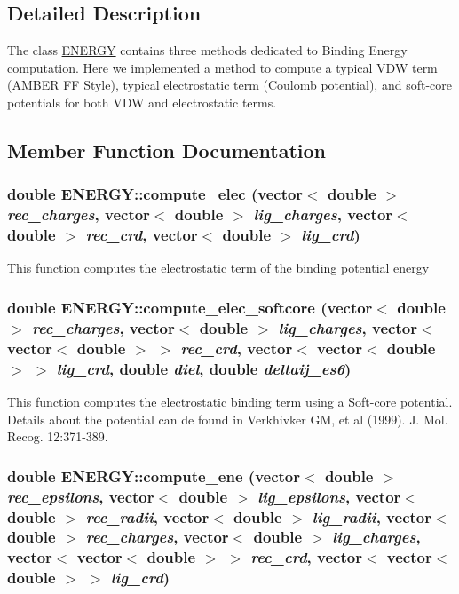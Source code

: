 \subsection{Detailed Description}
The class \hyperlink{classENERGY}{ENERGY} contains three methods dedicated to Binding Energy computation. Here we implemented a method to compute a typical VDW term (AMBER FF Style), typical electrostatic term (Coulomb potential), and soft-\/core potentials for both VDW and electrostatic terms. 

\subsection{Member Function Documentation}
\hypertarget{classENERGY_a7ee01a8c6db5ab51a468c9d7ce3dea2f}{
\subsubsection[{compute\_\-elec}]{\setlength{\rightskip}{0pt plus 5cm}double ENERGY::compute\_\-elec (vector$<$ double $>$ {\em rec\_\-charges}, \/  vector$<$ double $>$ {\em lig\_\-charges}, \/  vector$<$ double $>$ {\em rec\_\-crd}, \/  vector$<$ double $>$ {\em lig\_\-crd})}}
\label{classENERGY_a7ee01a8c6db5ab51a468c9d7ce3dea2f}
This function computes the electrostatic term of the binding potential energy \hypertarget{classENERGY_a2823f8524885ae4866f7baf9d6736359}{
\subsubsection[{compute\_\-elec\_\-softcore}]{\setlength{\rightskip}{0pt plus 5cm}double ENERGY::compute\_\-elec\_\-softcore (vector$<$ double $>$ {\em rec\_\-charges}, \/  vector$<$ double $>$ {\em lig\_\-charges}, \/  vector$<$ vector$<$ double $>$ $>$ {\em rec\_\-crd}, \/  vector$<$ vector$<$ double $>$ $>$ {\em lig\_\-crd}, \/  double {\em diel}, \/  double {\em deltaij\_\-es6})}}
\label{classENERGY_a2823f8524885ae4866f7baf9d6736359}
This function computes the electrostatic binding term using a Soft-\/core potential. Details about the potential can de found in Verkhivker GM, et al (1999). J. Mol. Recog. 12:371-\/389. \hypertarget{classENERGY_a71a6fd89c93fcd0a0a3a671c761972c2}{
\subsubsection[{compute\_\-ene}]{\setlength{\rightskip}{0pt plus 5cm}double ENERGY::compute\_\-ene (vector$<$ double $>$ {\em rec\_\-epsilons}, \/  vector$<$ double $>$ {\em lig\_\-epsilons}, \/  vector$<$ double $>$ {\em rec\_\-radii}, \/  vector$<$ double $>$ {\em lig\_\-radii}, \/  vector$<$ double $>$ {\em rec\_\-charges}, \/  vector$<$ double $>$ {\em lig\_\-charges}, \/  vector$<$ vector$<$ double $>$ $>$ {\em rec\_\-crd}, \/  vector$<$ vector$<$ double $>$ $>$ {\em lig\_\-crd})}}

